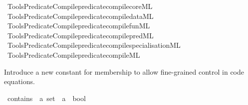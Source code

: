 \begin{isabellebody}
\isamarkupfalse%
\ {\isacartoucheopen}Tools{\isacharslash}{\kern0pt}Predicate{\isacharunderscore}{\kern0pt}Compile{\isacharslash}{\kern0pt}predicate{\isacharunderscore}{\kern0pt}compile{\isacharunderscore}{\kern0pt}core{\isachardot}{\kern0pt}ML{\isacartoucheclose}\isanewline
{}\isamarkupfalse%
\ {\isacartoucheopen}Tools{\isacharslash}{\kern0pt}Predicate{\isacharunderscore}{\kern0pt}Compile{\isacharslash}{\kern0pt}predicate{\isacharunderscore}{\kern0pt}compile{\isacharunderscore}{\kern0pt}data{\isachardot}{\kern0pt}ML{\isacartoucheclose}\isanewline
{}\isamarkupfalse%
\ {\isacartoucheopen}Tools{\isacharslash}{\kern0pt}Predicate{\isacharunderscore}{\kern0pt}Compile{\isacharslash}{\kern0pt}predicate{\isacharunderscore}{\kern0pt}compile{\isacharunderscore}{\kern0pt}fun{\isachardot}{\kern0pt}ML{\isacartoucheclose}\isanewline
{}\isamarkupfalse%
\ {\isacartoucheopen}Tools{\isacharslash}{\kern0pt}Predicate{\isacharunderscore}{\kern0pt}Compile{\isacharslash}{\kern0pt}predicate{\isacharunderscore}{\kern0pt}compile{\isacharunderscore}{\kern0pt}pred{\isachardot}{\kern0pt}ML{\isacartoucheclose}\isanewline
{}\isamarkupfalse%
\ {\isacartoucheopen}Tools{\isacharslash}{\kern0pt}Predicate{\isacharunderscore}{\kern0pt}Compile{\isacharslash}{\kern0pt}predicate{\isacharunderscore}{\kern0pt}compile{\isacharunderscore}{\kern0pt}specialisation{\isachardot}{\kern0pt}ML{\isacartoucheclose}\isanewline
{}\isamarkupfalse%
\ {\isacartoucheopen}Tools{\isacharslash}{\kern0pt}Predicate{\isacharunderscore}{\kern0pt}Compile{\isacharslash}{\kern0pt}predicate{\isacharunderscore}{\kern0pt}compile{\isachardot}{\kern0pt}ML{\isacartoucheclose}%
\endisatagML
{\isafoldML}%
%
\isadelimML
%
\endisadelimML
%
\isadelimdocument
%
\endisadelimdocument
%
\isatagdocument
%
\isamarkuptrue%
%
\endisatagdocument
{\isafolddocument}%
%
\isadelimdocument
%
\endisadelimdocument
%
\begin{isamarkuptext}%
Introduce a new constant for membership to allow 
  fine-grained control in code equations.%
\end{isamarkuptext}\isamarkuptrue%
\isamarkupfalse%
\ contains\ {\isacharcolon}{\kern0pt}{\isacharcolon}{\kern0pt}\ {\isachardoublequoteopen}{\isacharprime}{\kern0pt}a\ set\ {\isacharequal}{\kern0pt}{\isachargreater}{\kern0pt}\ {\isacharprime}{\kern0pt}a\ {\isacharequal}{\kern0pt}{\isachargreater}{\kern0pt}\ bool{\isachardoublequoteclose}\isanewline

\end{isabellebody}
